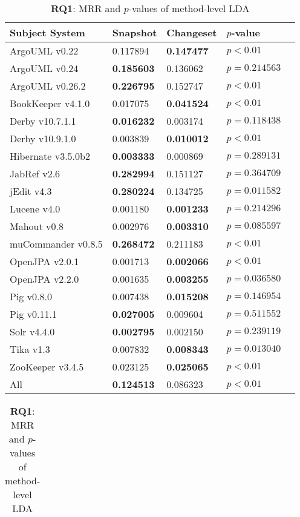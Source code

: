 \begin{table}[t]
\renewcommand{\arraystretch}{1.3}
\footnotesize
\centering
\caption{{\bf RQ1}: MRR and $p$-values of class-level LDA}
\begin{tabular}{l|ll|ll}
\toprule
Subject System & Snapshot & Changeset & $p$-value  \\
\midrule
ArgoUML v0.22 & 0.117894 & {\bf 0.147477 } & $p < 0.01$ \\
ArgoUML v0.24 & {\bf 0.185603 } & 0.136062 & $p = 0.214563$ \\
ArgoUML v0.26.2 & {\bf 0.226795 } & 0.152747 & $p < 0.01$ \\
BookKeeper v4.1.0 & 0.017075 & {\bf 0.041524 } & $p < 0.01$ \\
Derby v10.7.1.1 & {\bf 0.016232 } & 0.003174 & $p = 0.118438$ \\
Derby v10.9.1.0 & 0.003839 & {\bf 0.010012 } & $p < 0.01$ \\
Hibernate v3.5.0b2 & {\bf 0.003333 } & 0.000869 & $p = 0.289131$ \\
JabRef v2.6 & {\bf 0.282994 } & 0.151127 & $p = 0.364709$ \\
jEdit v4.3 & {\bf 0.280224 } & 0.134725 & $p = 0.011582$ \\
Lucene v4.0 & 0.001180 & {\bf 0.001233 } & $p = 0.214296$ \\
Mahout v0.8 & 0.002976 & {\bf 0.003310 } & $p = 0.085597$ \\
muCommander v0.8.5 & {\bf 0.268472 } & 0.211183 & $p < 0.01$ \\
OpenJPA v2.0.1 & 0.001713 & {\bf 0.002066 } & $p < 0.01$ \\
OpenJPA v2.2.0 & 0.001635 & {\bf 0.003255 } & $p = 0.036580$ \\
Pig v0.8.0 & 0.007438 & {\bf 0.015208 } & $p = 0.146954$ \\
Pig v0.11.1 & {\bf 0.027005 } & 0.009604 & $p = 0.511552$ \\
Solr v4.4.0 & {\bf 0.002795 } & 0.002150 & $p = 0.239119$ \\
Tika v1.3 & 0.007832 & {\bf 0.008343 } & $p = 0.013040$ \\
ZooKeeper v3.4.5 & 0.023125 & {\bf 0.025065 } & $p < 0.01$ \\
\midrule
All & {\bf 0.124513 } & 0.086323 & $p < 0.01$ \\
\bottomrule
\end{tabular}
\label{table:rq1:class:lda}
\caption{{\bf RQ1}: MRR and $p$-values of method-level LDA}
\begin{tabular}{l|ll|ll}

\end{tabular}
\end{table}
